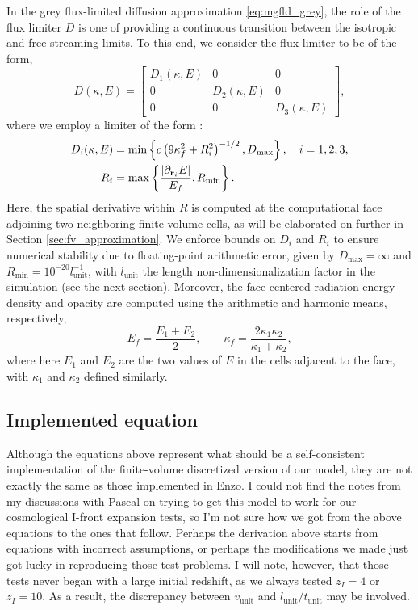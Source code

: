 \documentclass[10pt]{article}
\renewcommand{\(}{\left(}
\renewcommand{\)}{\right)}
\newcommand{\rvec}{{\bf r}}
\newcommand{\Lunit}{l_{\text{unit}}}
\newcommand{\Tunit}{t_{\text{unit}}}
\newcommand{\Vunit}{v_{\text{unit}}}
\begin{document}
In the grey flux-limited diffusion approximation
\eqref{eq:mgfld_grey}, the role of the flux limiter
$D$ is one of providing a continuous transition between the isotropic
and free-streaming limits.  To this end, we consider the flux limiter
to be of the form,
\[
   D(\kappa,E) = \left[\begin{array}{ccc} 
       D_1(\kappa,E) & 0 & 0 \\
       0 & D_2(\kappa,E) & 0 \\
       0 & 0 & D_3(\kappa,E) 
     \end{array}\right],
\]
where we employ a limiter of the form  \cite{Morel2000}: 
\begin{align}
  \label{eq:Morel_limiterD}
  D_i(\kappa,E) &= \min\left\{ c \left(9\kappa_f^2 + R_i^2\right)^{-1/2},
    D_\text{max} \right\}, \quad i=1,2,3,\\
  \label{eq:Morel_limiterR}
  R_i &= \max\left\{ \frac{|\partial_{\rvec_i}E|}{E_f}, R_\text{min} \right\}.
\end{align}
Here, the spatial derivative within $R$ is computed at the
computational face adjoining two neighboring finite-volume cells, as
will be elaborated on further in Section \ref{sec:fv_approximation}.
We enforce bounds on $D_i$ and $R_i$ to ensure numerical stability due
to floating-point arithmetic error, given by 
$D_\text{max} = \infty$ 
and 
$R_\text{min} = 10^{-20} \Lunit^{-1}$, 
with $\Lunit$ the length non-dimensionalization factor in the simulation
(see the next section).  Moreover, the face-centered radiation energy
density and opacity are computed using the arithmetic and harmonic
means, respectively,
\[
  E_f = \frac{E_1 + E_2}{2}, \qquad \kappa_f =
  \frac{2\kappa_1\kappa_2}{\kappa_1+\kappa_2}, 
\]
where here $E_1$ and $E_2$ are the two values of $E$ in the cells
adjacent to the face, with $\kappa_1$ and $\kappa_2$ defined
similarly. 




\subsection{Implemented equation}
\label{sec:fv_implementation}

Although the equations above represent what should be a
self-consistent implementation of the finite-volume discretized
version of our model, they are not exactly the same as those
implemented in Enzo.  I could not find the notes from my discussions
with Pascal on trying to get this model to work for our cosmological
I-front expansion tests, so I'm not sure how we got from the above
equations to the ones that follow.  Perhaps the derivation above
starts from equations with incorrect assumptions, or perhaps the
modifications we made just got lucky in reproducing those test
problems.  I will note, however, that those tests never began with a
large initial redshift, as we always tested $z_I = 4$ or $z_I = 10$.
As a result, the discrepancy between $\Vunit$ and $\Lunit/\Tunit$ may
be involved.
\end{document}
